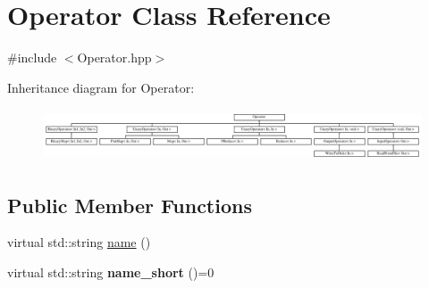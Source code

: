 \hypertarget{class_operator}{\section{\-Operator \-Class \-Reference}
\label{class_operator}
}


{\ttfamily \#include $<$\-Operator.\-hpp$>$}

\-Inheritance diagram for \-Operator\-:\begin{figure}[H]
\begin{center}
\leavevmode
\includegraphics[height=1.568627cm]{class_operator}
\end{center}
\end{figure}
\subsection*{\-Public \-Member \-Functions}
\begin{DoxyCompactItemize}
\item 
virtual std\-::string \hyperlink{class_operator_aabb42a0bffefa195ef28dcb8de28aec1}{name} ()
\item 
\hypertarget{class_operator_ab818c777eba5ea81a1e35bf15cd748ba}{virtual std\-::string {\bfseries name\-\_\-short} ()=0}\label{class_operator_ab818c777eba5ea81a1e35bf15cd748ba}

\end{DoxyCompactItemize}
